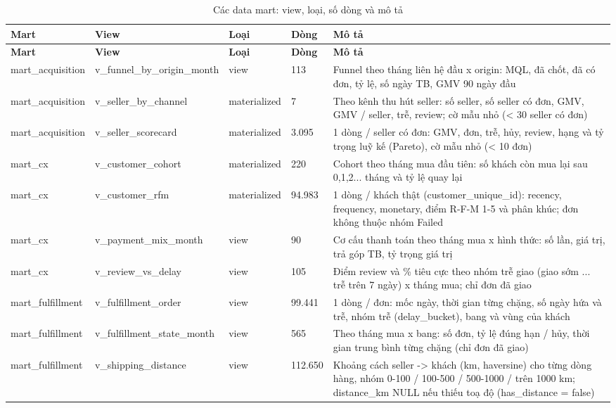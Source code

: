 {\small\begin{longtable}{llllp{6.3cm}}
\caption{Các data mart: view, loại, số dòng và mô tả}\label{tab:marts}\\
\toprule
\textbf{Mart} & \textbf{View} & \textbf{Loại} & \textbf{Dòng} & \textbf{Mô tả} \\
\midrule
\endfirsthead
\toprule
\textbf{Mart} & \textbf{View} & \textbf{Loại} & \textbf{Dòng} & \textbf{Mô tả} \\
\midrule
\endhead
\bottomrule
\endfoot
mart\_acquisition & v\_funnel\_by\_origin\_month & view & 113 & Funnel theo tháng liên hệ đầu x origin: MQL, đã chốt, đã có đơn, tỷ lệ, số ngày TB, GMV 90 ngày đầu \\
mart\_acquisition & v\_seller\_by\_channel & materialized & 7 & Theo kênh thu hút seller: số seller, số seller có đơn, GMV, GMV / seller, trễ, review; cờ mẫu nhỏ (< 30 seller có đơn) \\
mart\_acquisition & v\_seller\_scorecard & materialized & 3.095 & 1 dòng / seller có đơn: GMV, đơn, trễ, hủy, review, hạng và tỷ trọng luỹ kế (Pareto), cờ mẫu nhỏ (< 10 đơn) \\
mart\_cx & v\_customer\_cohort & materialized & 220 & Cohort theo tháng mua đầu tiên: số khách còn mua lại sau 0,1,2... tháng và tỷ lệ quay lại \\
mart\_cx & v\_customer\_rfm & materialized & 94.983 & 1 dòng / khách thật (customer\_unique\_id): recency, frequency, monetary, điểm R-F-M 1-5 và phân khúc; đơn không thuộc nhóm Failed \\
mart\_cx & v\_payment\_mix\_month & view & 90 & Cơ cấu thanh toán theo tháng mua x hình thức: số lần, giá trị, trả góp TB, tỷ trọng giá trị \\
mart\_cx & v\_review\_vs\_delay & view & 105 & Điểm review và \% tiêu cực theo nhóm trễ giao (giao sớm ... trễ trên 7 ngày) x tháng mua; chỉ đơn đã giao \\
mart\_fulfillment & v\_fulfillment\_order & view & 99.441 & 1 dòng / đơn: mốc ngày, thời gian từng chặng, số ngày hứa và trễ, nhóm trễ (delay\_bucket), bang và vùng của khách \\
mart\_fulfillment & v\_fulfillment\_state\_month & view & 565 & Theo tháng mua x bang: số đơn, tỷ lệ đúng hạn / hủy, thời gian trung bình từng chặng (chỉ đơn đã giao) \\
mart\_fulfillment & v\_shipping\_distance & view & 112.650 & Khoảng cách seller -> khách (km, haversine) cho từng dòng hàng, nhóm 0-100 / 100-500 / 500-1000 / trên 1000 km; distance\_km NULL nếu thiếu toạ độ (has\_distance = false) \\

\end{longtable}}
